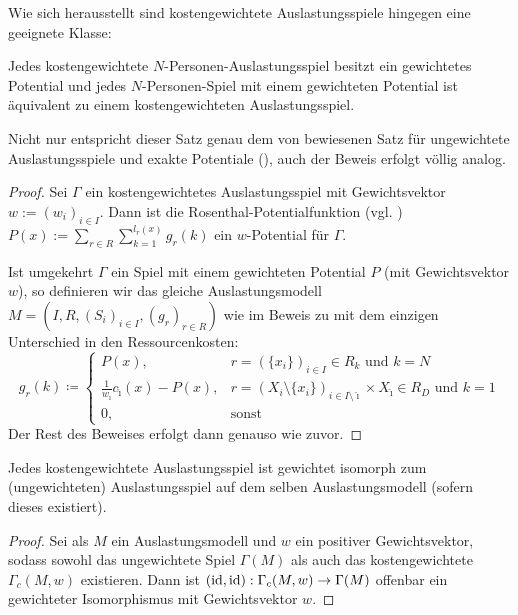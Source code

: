 Wie sich herausstellt sind kostengewichtete Auslastungsspiele hingegen eine geeignete Klasse:

\begin{satz}\label{satz:MondererShapleyKostengew}
	Jedes kostengewichtete $N$-Personen-Auslastungsspiel besitzt ein gewichtetes Potential und jedes $N$-Personen-Spiel mit einem gewichteten Potential ist äquivalent zu einem kostengewichteten Auslastungsspiel.
\end{satz}

Nicht nur entspricht dieser Satz genau dem von \citeauthor{MonShap} bewiesenen Satz für ungewichtete Auslastungsspiele und exakte Potentiale (), auch der Beweis erfolgt völlig analog. 

\begin{proof}
	Sei $\Gamma$ ein kostengewichtetes Auslastungsspiel mit Gewichtsvektor $w := (w_i)_{i\in I}$. Dann ist die Rosenthal-Potentialfunktion (vgl. \cite{RosenthalPotential}) $P(x) := \sum_{r \in R}\sum_{k=1}^{l_r(x)}g_r(k)$ ein $w$-Potential für $\Gamma$.
		
	Ist umgekehrt $\Gamma$ ein Spiel mit einem gewichteten Potential $P$ (mit Gewichtsvektor $w$), so definieren wir das gleiche Auslastungsmodell $M = (I, R, (S_i)_{i \in I}, (g_r)_{r \in R})$ wie im Beweis zu  mit dem einzigen Unterschied in den Ressourcenkosten:
		\[g_r(k) \coloneqq 
		\begin{cases}
		P(x), 									&r = \left(\{x_i\}\right)_{i \in I} \in R_k 													\text{ und } k=N \\
		\frac{1}{w_{\hat{\imath}}}c_{\hat{\imath}}(x) - P(x), 	&r = \left(X_i\setminus\{x_i\}\right)_{i \in I\setminus\hat{\imath}} \times X_{\hat{\imath}} \in R_D 	\text{ und } k=1 \\
		0,										&\text{sonst}
		\end{cases}\]
	Der Rest des Beweises erfolgt dann genauso wie zuvor.
\end{proof}

\begin{lemma}\label{lemma:KostengewAuslIsomZuAusl}
	Jedes kostengewichtete Auslastungsspiel ist gewichtet isomorph zum (ungewichteten) Auslastungsspiel auf dem selben Auslastungsmodell (sofern dieses existiert).
\end{lemma}

\begin{proof}
	Sei als $M$ ein Auslastungsmodell und $w$ ein positiver Gewichtsvektor, sodass sowohl das ungewichtete Spiel $\Gamma(M)$ als auch das kostengewichtete $\Gamma_c(M, w)$ existieren. Dann ist $(\mathrm{id}, \mathrm{id}): \Gamma_c(M,w) \to \Gamma(M)$ offenbar ein gewichteter Isomorphismus mit Gewichtsvektor $w$.
\end{proof}


